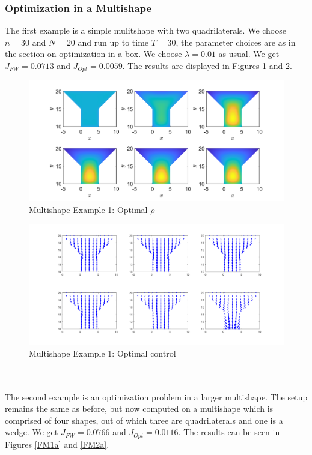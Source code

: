 \documentclass[11pt, a4paper]{article}
\theoremstyle{definition}
\begin{document}
\subsubsection{Optimization in a Multishape}
The first example is a simple mulitshape with two quadrilaterals. We choose $n = 30$ and $N = 20$ and run up to time $T = 30$, the parameter choices are as in the section on optimization in a box. We choose $\lambda = 0.01$ as usual. We get $J_{FW} = 0.0713$ and $J_{Opt} = 0.0059$. The results are displayed in Figures \ref{FM0} and \ref{FM0a}.
\begin{figure}[h]
	\centering
	\includegraphics[scale=0.35]{MultiOpt1a.png}
	\caption{Multishape Example 1: Optimal $\rho$} 
	\label{FM0}
\end{figure}
\begin{figure}[h]
	\centering
	\includegraphics[scale=0.35]{MultiCont1a.png}
	\caption{Multishape Example 1: Optimal control} 
	\label{FM0a}
\end{figure}
\\
\\
The second example is an optimization problem in a larger multishape. The setup remains the same as before, but now computed on a multishape which is comprised of four shapes, out of which three are quadrilaterals and one is a wedge. We get $J_{FW} = 0.0766$ and $J_{Opt} = 0.0116$. The results can be seen in Figures \ref{FM1a} and \ref{FM2a}.
\end{document}
